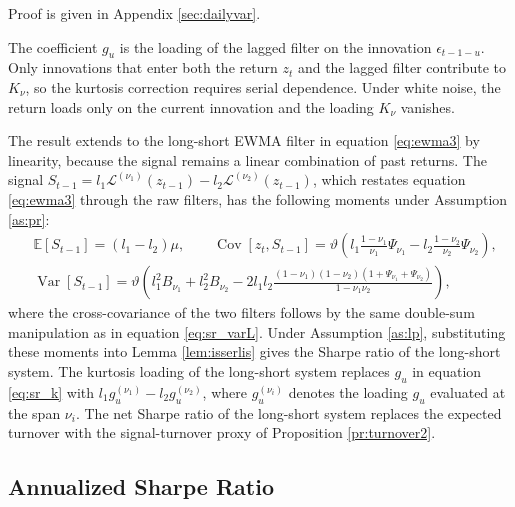 \documentclass[hidelinks]{siamonline250211}
\DeclareMathOperator{\Var}{Var}
\DeclareMathOperator{\Cov}{Cov}
\begin{document}
Proof is given in Appendix \ref{sec:dailyvar}.

The coefficient $g_{u}$ is the loading of the lagged filter on the innovation $\epsilon_{t-1-u}$. Only innovations that enter both the return $z_{t}$ and the lagged filter contribute to $K_{\nu}$, so the kurtosis correction requires serial dependence. Under white noise, the return loads only on the current innovation and the loading $K_{\nu}$ vanishes. 

\begin{corollary}\label{col:sr_ls} The result extends to the long-short EWMA filter in equation \eqref{eq:ewma3} by linearity, because the signal remains a linear combination of past returns. The signal $S_{t-1}=l_{1}\mathcal{L}^{(\nu_{1})}(z_{t-1})-l_{2}\mathcal{L}^{(\nu_{2})}(z_{t-1})$, which restates equation \eqref{eq:ewma3} through the raw filters, has the following moments under Assumption \ref{as:pr}:
	\begin{equation} \label{eq:sr_ls}
		\begin{split}
			& \mathbb{E}\left[ S_{t-1} \right] = \left(l_{1}-l_{2}\right)\mu, \qquad
			\Cov\left[ z_{t}, S_{t-1} \right] = \vartheta \left( l_{1} \frac{1-\nu_{1}}{\nu_{1}}\Psi_{\nu_{1}} - l_{2} \frac{1-\nu_{2}}{\nu_{2}}\Psi_{\nu_{2}} \right), \\
			&  \Var\left[ S_{t-1} \right] = \vartheta \left( l^{2}_{1} B_{\nu_{1}} + l^{2}_{2} B_{\nu_{2}} - 2l_{1}l_{2} \frac{\left(1-\nu_{1}\right)\left(1-\nu_{2}\right)\left(1+\Psi_{\nu_{1}}+\Psi_{\nu_{2}}\right)}{1-\nu_{1}\nu_{2}} \right),
		\end{split}
	\end{equation}
	where the cross-covariance of the two filters follows by the same double-sum manipulation as in equation \eqref{eq:sr_varL}. Under Assumption \ref{as:lp}, substituting these moments into Lemma \ref{lem:isserlis} gives the Sharpe ratio of the long-short system. The kurtosis loading of the long-short system replaces $g_{u}$ in equation \eqref{eq:sr_k} with $l_{1}g^{(\nu_{1})}_{u}-l_{2}g^{(\nu_{2})}_{u}$, where $g^{(\nu_{i})}_{u}$ denotes the loading $g_{u}$ evaluated at the span $\nu_{i}$. The net Sharpe ratio of the long-short system replaces the expected turnover with the signal-turnover proxy of Proposition \ref{pr:turnover2}.
\end{corollary}




\subsection{Annualized Sharpe Ratio}
\end{document}
